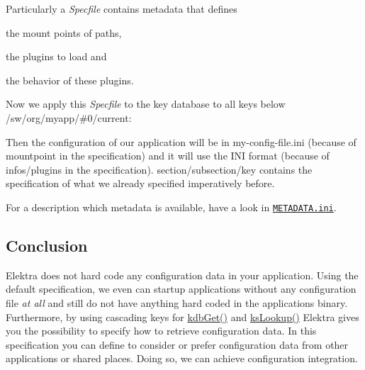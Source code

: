 Particularly a {\itshape Specfile} contains metadata that defines


\begin{DoxyItemize}
\item the mount points of paths,
\item the plugins to load and
\item the behavior of these plugins.
\end{DoxyItemize}




Now we apply this {\itshape Specfile} to the key database to all keys below {\ttfamily /sw/org/myapp/\#0/current}\+:




Then the configuration of our application will be in my-\/config-\/file.\+ini (because of {\ttfamily mountpoint} in the specification) and it will use the I\+NI format (because of {\ttfamily infos/plugins} in the specification). {\ttfamily section/subsection/key} contains the specification of what we already specified imperatively before.

For a description which metadata is available, have a look in \href{/home/markus/Projekte/Elektra/current/doc/METADATA.ini}{\tt M\+E\+T\+A\+D\+A\+T\+A.\+ini}.

\subsection*{Conclusion}

Elektra does not hard code any configuration data in your application. Using the {\ttfamily default} specification, we even can startup applications without any configuration file {\itshape at all} and still do not have anything hard coded in the applications binary. Furthermore, by using cascading keys for {\ttfamily \hyperlink{group__kdb_ga28e385fd9cb7ccfe0b2f1ed2f62453a1}{kdb\+Get()}} and {\ttfamily \hyperlink{group__keyset_gaa34fc43a081e6b01e4120daa6c112004}{ks\+Lookup()}} Elektra gives you the possibility to specify how to retrieve configuration data. In this specification you can define to consider or prefer configuration data from other applications or shared places. Doing so, we can achieve configuration integration.

